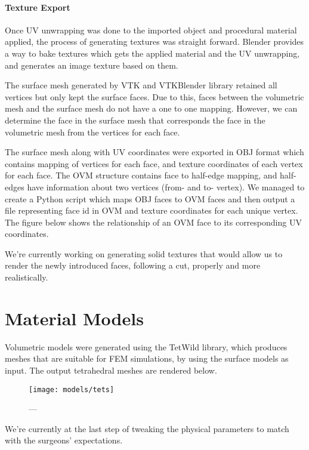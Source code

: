 \paragraph{Texture Export}
Once UV unwrapping was done to the imported object and procedural material applied, the process of generating textures was straight forward. Blender provides a way to bake textures which gets the applied material and the UV unwrapping, and generates an image texture based on them.

The surface mesh generated by VTK and VTKBlender library retained all vertices but only kept the surface faces. Due to this, faces between the volumetric mesh and the surface mesh do not have a one to one mapping. However, we can determine the face in the surface mesh that corresponds the face in the volumetric mesh from the vertices for each face.

The surface mesh along with UV coordinates were exported in OBJ format which contains mapping of vertices for each face, and texture coordinates of each vertex for each face. The OVM structure contains face to half-edge mapping, and half-edges have information about two vertices (from- and to- vertex). We managed to create a Python script which maps OBJ faces to OVM faces and then output a file representing face id in OVM and texture coordinates for each unique vertex. The figure below shows the relationship of an OVM face to its corresponding UV coordinates.

We're currently working on generating solid textures that would allow us to render the newly introduced faces, following a cut, properly and more realistically.

\section{Material Models}
Volumetric models were generated using the TetWild library, which produces meshes that are suitable for FEM simulations, by using the surface models as input. The output tetrahedral meshes are rendered below.

\begin{figure}
  \centering%
  \texttt{[image: models/tets]}
  \caption{---}\label{fig:tetra_meshes}
\end{figure}

We're currently at the last step of tweaking the physical parameters to match with the surgeons' expectations.

\clearpage%
